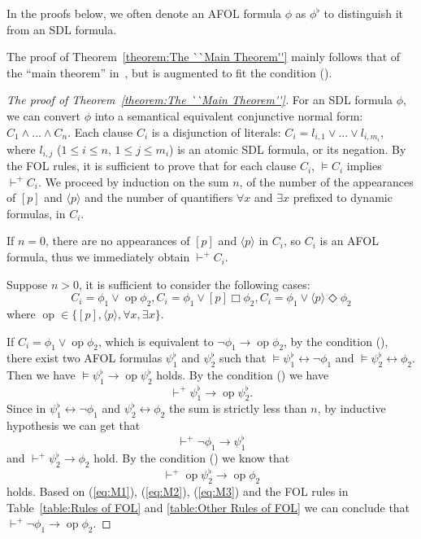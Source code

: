 \documentclass{fcs}
\newcommand{\la}[0]{\langle}
\newcommand{\ra}[0]{\rangle}
\newcommand{\rmn}[1]{(\romannumeral#1)}
\newcommand{\reld}[0]{\mathit{\vdash^+}}
\begin{document}
In the proofs below, we often denote an AFOL formula $\phi$ as $\phi^\flat$ to distinguish it from an SDL formula.

The proof of Theorem~\ref{theorem:The ``Main Theorem''} mainly follows that of the ``main theorem'' in~\cite{Harel79}, but is augmented to fit the condition \rmn{4}.


\begin{proof}[The proof of Theorem~\ref{theorem:The ``Main Theorem''}]
    For an SDL formula $\phi$, we can convert $\phi$ into a semantical equivalent conjunctive normal form: $C_1\wedge ...\wedge C_n$.
Each clause $C_i$ is a disjunction of literals: $C_i = l_{i,1}\vee...\vee l_{i,m_i}$, where $l_{i,j}$ ($1\le i\le n$, $1\le j\le m_i$) is an atomic SDL formula, or its negation.
By the FOL rules, it is sufficient to prove that for each clause $C_i$, $\models C_i$ implies $\reld C_i$.
We proceed by induction on the sum $n$, of the number of the appearances of $[p]$ and $\la p\ra$ and the number of quantifiers $\forall x$ and $\exists x$ prefixed to dynamic formulas,
in $C_i$.

If $n=0$, there are no appearances of $[p]$ and $\la p\ra$ in $C_i$, so $C_i$ is an AFOL formula, thus we immediately obtain $\reld C_i$.

Suppose $n>0$, it is sufficient to consider the following cases:
$$C_i = \phi_1 \vee \mathop{op} \phi_2, C_i = \phi_1\vee [p] \Box\phi_2, C_i = \phi_1\vee \la p\ra \Diamond\phi_2$$
where $\mathop{op}\in \{[p],\la p\ra, \forall x, \exists x\}$.


If $C_i= \phi_1 \vee \mathop{op} \phi_2$, which is equivalent to $\neg \phi_1\to \mathop{op} \phi_2$, by the condition \rmn{1}, there exist two AFOL formulas $\psi^\flat_1$ and $\psi^\flat_2$ such that
$\models\psi^\flat_1\leftrightarrow \neg \phi_1$ and $\models \psi^\flat_2\leftrightarrow \phi_2$. Then we have $\models \psi^\flat_1\to \mathop{op} \psi^\flat_2$ holds.
By the condition \rmn{2} we have \begin{equation}\label{eq:M1}\reld\psi^\flat_1\to \mathop{op} \psi^\flat_2.\end{equation}
Since in $\psi^\flat_1\leftrightarrow \neg \phi_1$ and $\psi^\flat_2\leftrightarrow \phi_2$ the sum is strictly less than $n$, by inductive hypothesis we can get that
\begin{equation}\label{eq:M2}\reld\neg \phi_1\to \psi^\flat_1\end{equation} and $\reld\psi^\flat_2\to \phi_2$ hold.
By the condition \rmn{3} we know that \begin{equation}\label{eq:M3}\reld \mathop{op} \psi^\flat_2\to \mathop{op} \phi_2\end{equation} holds.
Based on (\ref{eq:M1}), (\ref{eq:M2}), (\ref{eq:M3}) and the FOL rules in Table~\ref{table:Rules of FOL} and \ref{table:Other Rules of FOL} we can conclude that $\reld\neg \phi_1\to \mathop{op} \phi_2$.


\end{proof}
\end{document}
